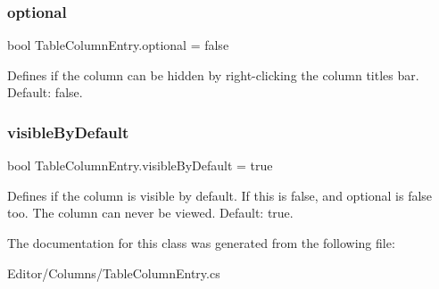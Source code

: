 \mbox{\label{class_table_column_entry_a475870b7af204554a3ee617cc68886e1}} 
\subsubsection{\texorpdfstring{optional}{optional}}
{\footnotesize\ttfamily bool Table\+Column\+Entry.\+optional = false}



Defines if the column can be hidden by right-\/clicking the column titles bar. Default\+: false. 

\mbox{\label{class_table_column_entry_a4271193e2502ef06798966773677d3a8}} 
\subsubsection{\texorpdfstring{visible\+By\+Default}{visibleByDefault}}
{\footnotesize\ttfamily bool Table\+Column\+Entry.\+visible\+By\+Default = true}



Defines if the column is visible by default. If this is false, and optional is false too. The column can never be viewed. Default\+: true. 



The documentation for this class was generated from the following file\+:\begin{DoxyCompactItemize}
\item 
Editor/\+Columns/Table\+Column\+Entry.\+cs\end{DoxyCompactItemize}
